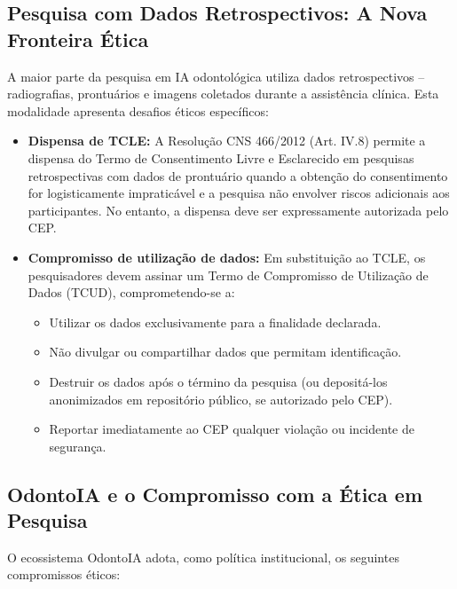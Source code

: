 \subsection{Pesquisa com Dados Retrospectivos: A Nova Fronteira Ética}

A maior parte da pesquisa em IA odontológica utiliza dados retrospectivos --
radiografias, prontuários e imagens coletados durante a assistência clínica.
Esta modalidade apresenta desafios éticos específicos:

\begin{itemize}
  \item \textbf{Dispensa de TCLE:} A Resolução CNS 466/2012 (Art. IV.8) permite
    a dispensa do Termo de Consentimento Livre e Esclarecido em pesquisas
    retrospectivas com dados de prontuário quando a obtenção do consentimento
    for logisticamente impraticável e a pesquisa não envolver riscos adicionais
    aos participantes. No entanto, a dispensa deve ser expressamente autorizada
    pelo CEP.

  \item \textbf{Compromisso de utilização de dados:} Em substituição ao TCLE,
    os pesquisadores devem assinar um Termo de Compromisso de Utilização de
    Dados (TCUD), comprometendo-se a:
    \begin{itemize}
      \item Utilizar os dados exclusivamente para a finalidade declarada.
      \item Não divulgar ou compartilhar dados que permitam identificação.
      \item Destruir os dados após o término da pesquisa (ou depositá-los
        anonimizados em repositório público, se autorizado pelo CEP).
      \item Reportar imediatamente ao CEP qualquer violação ou incidente de
        segurança.
    \end{itemize}
\end{itemize}

\subsection{OdontoIA e o Compromisso com a Ética em Pesquisa}

O ecossistema OdontoIA adota, como política institucional, os seguintes
compromissos éticos:

